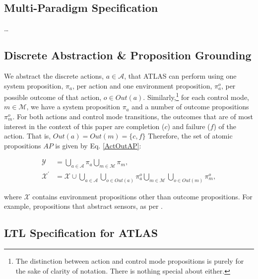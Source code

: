 
\subsection{Multi-Paradigm Specification}

\ldots

\subsection{Discrete Abstraction \& Proposition Grounding}


We abstract the discrete actions, $a \in \mathcal{A}$, that ATLAS can perform using one system proposition, $\pi_a$, per action and one environment proposition, $\pi_a^o$, per possible outcome of that action, $o \in Out(a)$.
Similarly,\footnote{The distinction between action and control mode propositions is purely for the sake of clarity of notation. There is nothing special about either.}
for each control mode, $m \in \mathcal{M}$, we have a system proposition $\pi_a$ and a number of outcome propositions $\pi_m^o$.
For both actions and control mode transitions, the outcomes that are of most interest in the context of this paper are completion ($c$) and failure ($f$) of the action. That is, $Out(a) = Out(m) = \{ c, f \}$
Therefore, the set of atomic propositions $AP$ is given by Eq. \eqref{ActOutAP}:

\begin{subequations}
	\label{ActOutAP}
	\begin{align}
		\mathcal{Y} &= \bigcup \limits_{a \in \mathcal{A}} \pi_a \bigcup \limits_{m \in \mathcal{M}} \pi_m,\\
		\mathcal{X}^\prime &= \mathcal{X} \cup \bigcup \limits_{a \in \mathcal{A}} \bigcup \limits_{o \in Out(a)} \pi_a^o \bigcup \limits_{m \in \mathcal{M}} \bigcup \limits_{o \in Out(m)} \pi_m^o,
	\end{align}
\end{subequations}

where $\mathcal{X}$ contains environment propositions other than outcome propositions. For example, propositions that abstract sensors, as per \cite{KGFP_TRO09}.

\subsection{LTL Specification for ATLAS}

